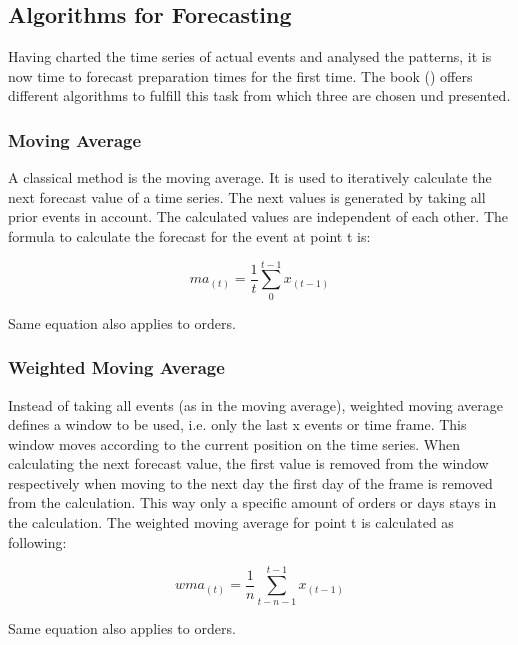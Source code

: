 \subsection{Algorithms for Forecasting}\label{subsection:Algorithms for Forecasting}
Having charted the time series of actual events and analysed the patterns, it is now time to forecast preparation times for the first time. The book (\cite{Hyndman.2013}) offers different algorithms to fulfill this task from which three are chosen und presented.
\subsubsection{Moving Average}\label{subsubsection:Moving Average}
A classical method is the moving average. It is used to iteratively calculate the next forecast value of a time series. The next values is generated by taking all prior events in account. The calculated values are independent of each other. The formula to calculate the forecast for the event at point t is:
\begin{center}
\begin{equation}
ma_{(t)}= \frac{1}{t}\sum^{t-1}_0 x_{(t-1)}
\end{equation}
\end{center}
Same equation also applies to orders.

\subsubsection{Weighted Moving Average}\label{subsubsection:Weighted Moving Average}
Instead of taking all events (as in the moving average), weighted moving average defines a window to be used, i.e. only the last x events or time frame. This window moves according to the current position on the time series. When calculating the next forecast value, the first value is removed from the window respectively when moving to the next day the first day of the frame is removed from the calculation. This way only a specific amount of orders or days stays in the calculation. The weighted moving average for point t is calculated as following:

\begin{center}
\begin{equation}
wma_{(t)}= \frac{1}{n}\sum^{t-1}_{t-n-1} x_{(t-1)}
\end{equation}
\end{center}
Same equation also applies to orders.

